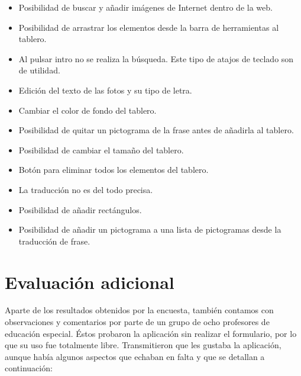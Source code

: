 \begin{itemize}
	\item Posibilidad de buscar y añadir imágenes de Internet dentro de la web.
	\item Posibilidad de arrastrar los elementos desde la barra de herramientas al tablero.
	\item Al pulsar intro no se realiza la búsqueda. Este tipo de atajos de teclado son de utilidad.
	\item Edición del texto de las fotos y su tipo de letra.
	\item Cambiar el color de fondo del tablero.
	\item Posibilidad de quitar un pictograma de la frase antes de añadirla al tablero.
	\item Posibilidad de cambiar el tamaño del tablero.
	\item Botón para eliminar todos los elementos del tablero.
	\item La traducción no es del todo precisa.
	\item Posibilidad de añadir rectángulos.
	\item Posibilidad de añadir un pictograma a una lista de pictogramas desde la traducción de frase. 
\end{itemize}

\section{Evaluación adicional}
\label{cap6:sec:evaluacion}

Aparte de los resultados obtenidos por la encuesta, también contamos con observaciones y comentarios por parte de un grupo de ocho profesores de educación especial. Éstos probaron la aplicación sin realizar el formulario, por lo que su uso fue totalmente libre. Transmitieron que les gustaba la aplicación, aunque había algunos aspectos que echaban en falta y que se detallan a continuación: 

